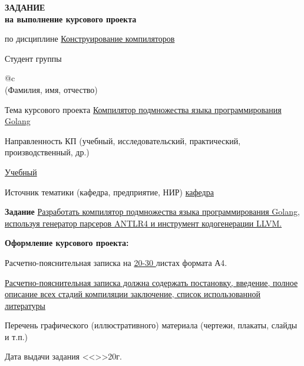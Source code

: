 \begin{titlepage}
    \vfill

    \begin{center}
        \fontsize{16pt}{0.6\baselineskip}\selectfont

        \textbf{ЗАДАНИЕ \\ на выполнение курсового проекта}
    \end{center}

    \begin{flushleft}
        \fontsize{11pt}{0.4cm}\selectfont
        по дисциплине \uline{\hfill Конструирование компиляторов \hfill}

        Студент группы \uline{}

        \begin{signstabular}[0.5]{@{}c}
            \uline{} \\
            \scriptsize (Фамилия, имя, отчество)
        \end{signstabular}

        Тема курсового проекта \uline{\hfill Компилятор подмножества языка программирования Golang \hfill}

        Направленность КП (учебный, исследовательский, практический, производственный, др.)

        \uline{\hfill Учебный \hfill}

        Источник тематики (кафедра, предприятие, НИР) \uline{\hfill кафедра \hfill}

        \textbf{Задание} \uline{\hfill Разработать компилятор подмножества языка программирования Golang,
            используя генератор парсеров ANTLR4 и инструмент кодогенерации LLVM.  \hfill}

        \textbf{Оформление курсового проекта:}

        Расчетно-пояснительная записка на \uline{ 20-30 } листах формата А4.

        \uline{\hfill Расчетно-пояснительная записка должна содержать постановку, введение, полное описание всех стадий
        компиляции заключение, список использованной литературы  \hfill}

        Перечень графического (иллюстративного) материала (чертежи, плакаты, слайды и т.п.)

        Дата выдачи задания <<\uline{\mbox{\hspace*{1cm}}}>>\uline{\mbox{\hspace*{4cm}}}20\uline{\mbox{\hspace*{0.8cm}}}г.


\end{flushleft}
\end{titlepage}
